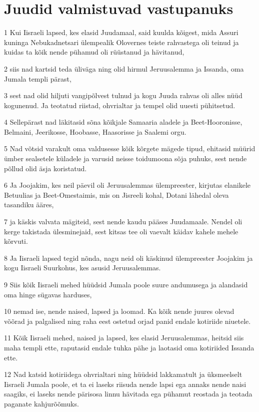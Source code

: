 \section*{Juudid valmistuvad vastupanuks}

\par 1 Kui Iisraeli lapsed, kes elasid Juudamaal, said kuulda kõigest, mida Assuri kuninga Nebukadnetsari ülempealik Olovernes teiste rahvastega oli teinud ja kuidas ta kõik nende pühamud oli rüüstanud ja hävitanud,
\par 2 siis nad kartsid teda üliväga ning olid hirmul Jeruusalemma ja Issanda, oma Jumala templi pärast,
\par 3 sest nad olid hiljuti vangipõlvest tulnud ja kogu Juuda rahvas oli alles nüüd kogunenud. Ja teotatud riistad, ohvrialtar ja tempel olid uuesti pühitsetud.
\par 4 Sellepärast nad läkitasid sõna kõikjale Samaaria aladele ja Beet-Hooronisse, Belmaini, Jeerikosse, Hoobasse, Haasorisse ja Saalemi orgu.
\par 5 Nad võtsid varakult oma valdusesse kõik kõrgete mägede tipud, ehitasid müürid ümber sealsetele küladele ja varusid neisse toidumoona sõja puhuks, sest nende põllud olid äsja koristatud.
\par 6 Ja Joojakim, kes neil päevil oli Jeruusalemmas ülempreester, kirjutas elanikele Betuulias ja Beet-Omestaimis, mis on Jisreeli kohal, Dotani lähedal oleva tasandiku ääres,
\par 7 ja käskis valvata mägiteid, sest nende kaudu pääses Juudamaale. Nendel oli kerge takistada ülesminejaid, sest kitsas tee oli vaevalt käidav kahele mehele kõrvuti.
\par 8 Ja Iisraeli lapsed tegid nõnda, nagu neid oli käskinud ülempreester Joojakim ja kogu Iisraeli Suurkohus, kes asusid Jeruusalemmas.
\par 9 Siis kõik Iisraeli mehed hüüdsid Jumala poole suure andumusega ja alandasid oma hinge sügavas harduses,
\par 10 nemad ise, nende naised, lapsed ja loomad. Ka kõik nende juures olevad võõrad ja palgalised ning raha eest ostetud orjad panid endale kotiriide niuetele.
\par 11 Kõik Iisraeli mehed, naised ja lapsed, kes elasid Jeruusalemmas, heitsid siis maha templi ette, raputasid endale tuhka pähe ja laotasid oma kotiriided Issanda ette.
\par 12 Nad katsid kotiriidega ohvrialtari ning hüüdsid lakkamatult ja üksmeelselt Iisraeli Jumala poole, et ta ei laseks riisuda nende lapsi ega annaks nende naisi saagiks, ei laseks nende pärisosa linnu hävitada ega pühamut reostada ja teotada paganate kahjurõõmuks.
